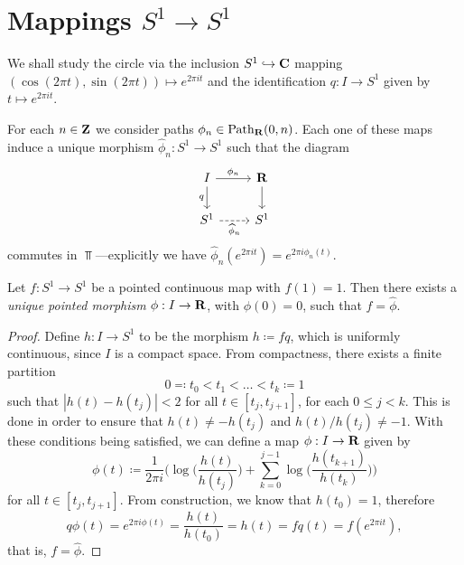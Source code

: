 

\section{Mappings \texorpdfstring{\(S^1 \longrightarrow S^1\)}{S1 -> S1}}

We shall study the circle via the inclusion \(S^1 \hookrightarrow \mathbf{C}\) mapping
\((\cos(2 \pi t), \sin(2 \pi t)) \mapsto e^{2 \pi i t}\) and the identification
\(q: I \to S^1\) given by \(t \mapsto e^{2 \pi i t}\).

For each \(n \in \mathbf{Z}\) we consider paths \(\phi_n \in \operatorname{Path}_{\mathbf{R}}(0, n)\). Each
one of these maps induce a unique morphism \(\widehat \phi_n: S^1 \to S^1\) such
that the diagram
\[
\begin{tikzcd}
I \ar[r, "\phi_n"] \ar[d, "q"'] &\R \ar[d] \\
S^1 \ar[r, dashed, "\widehat \phi_n"'] &S^1
\end{tikzcd}
\]
commutes in \(\Top\)---explicitly we have
\(\widehat \phi_n(e^{2 \pi i t}) = e^{2 \pi i \phi_n(t)}\).

\begin{proposition}
\label{prop:unwinding-pointed-maps}
Let \(f: S^1 \to S^1\) be a pointed continuous map with \(f(1) = 1\). Then there
exists a \emph{unique pointed morphism} \(\phi: I \to \mathbf{R}\), with
\(\phi(0) = 0\), such that \(f = \widehat \phi\).
\end{proposition}

\begin{proof}
Define \(h: I \to S^1\) to be the morphism \(h \coloneq f q\), which is
uniformly continuous, since \(I\) is a compact space. From compactness, there
exists a finite partition
\[
0 \eqqcolon t_0 < t_1 < \dots < t_k \coloneq 1
\]
such that \(|h(t) - h(t_j)| < 2\) for all \(t \in [t_j, t_{j+1}]\), for each
\(0 \leq j < k\). This is done in order to ensure that \(h(t) \neq -h(t_j)\) and
\(h(t)/h(t_j) \neq -1\). With these conditions being satisfied, we can define a
map \(\phi: I \to \mathbf{R}\) given by
\[
\phi(t) \coloneq
\frac{1}{2 \pi i} \bigg(
  \log\Big( \frac{h(t)}{h(t_j)} \Big)
  + \sum_{k=0}^{j-1} \log \Big( \frac{h(t_{k+1})}{h(t_k)} \Big)
\bigg)
\]
for all \(t \in [t_j, t_{j+1}]\). From construction, we know that \(h(t_0) =
1\), therefore
\[
q \phi(t)
= e^{2 \pi i \phi(t)}
= \frac{h(t)}{h(t_0)}
= h(t)
= fq(t)
= f(e^{2\pi i t}),
\]
that is, \(f = \widehat \phi\).
\end{proof}

